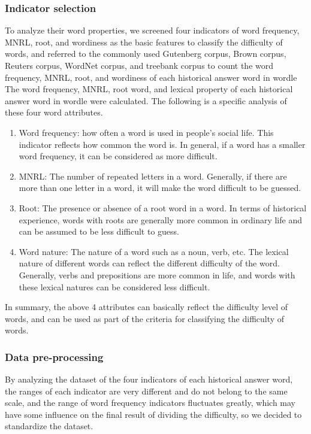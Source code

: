 \documentclass[12pt]{article}  %
\begin{document}
\subsubsection{Indicator selection}
To analyze their word properties, we screened four indicators of word frequency, MNRL, root, and wordiness as the basic features to classify the difficulty of words, and referred to the commonly used Gutenberg corpus, Brown corpus, Reuters corpus, WordNet corpus, and treebank corpus to count the word frequency, MNRL, root, and wordiness of each historical answer word in wordle The word frequency, MNRL, root word, and lexical property of each historical answer word in wordle were calculated. The following is a specific analysis of these four word attributes.

\begin{enumerate}
	\item Word frequency: how often a word is used in people's social life. This indicator reflects how common the word is. In general, if a word has a smaller word frequency, it can be considered as more difficult.
	\item MNRL: The number of repeated letters in a word. Generally, if there are more than one letter in a word, it will make the word difficult to be guessed.
	\item Root: The presence or absence of a root word in a word. In terms of historical experience, words with roots are generally more common in ordinary life and can be assumed to be less difficult to guess.
	\item Word nature: The nature of a word such as a noun, verb, etc. The lexical nature of different words can reflect the different difficulty of the word. Generally, verbs and prepositions are more common in life, and words with these lexical natures can be considered less difficult.
\end{enumerate}

In summary, the above 4 attributes can basically reflect the difficulty level of words, and can be used as part of the criteria for classifying the difficulty of words.

\subsubsection{Data pre-processing}

By analyzing the dataset of the four indicators of each historical answer word, the ranges of each indicator are very different and do not belong to the same scale, and the range of word frequency indicators fluctuates greatly, which may have some influence on the final result of dividing the difficulty, so we decided to standardize the dataset.
\end{document}
